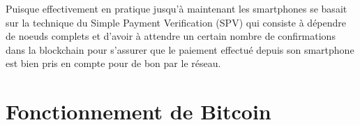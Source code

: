 \documentclass[12pt,a4paper]{article}
\begin{document}
	Puisque effectivement en pratique jusqu'à maintenant les smartphones se basait sur la technique du Simple Payment Verification (SPV) qui consiste à dépendre de noeuds complets et d'avoir à attendre un certain nombre de confirmations dans la blockchain pour s'assurer que le paiement effectué depuis son smartphone est bien pris en compte pour de bon par le réseau.\\
	
	
	
	\newpage
	
	\section{Fonctionnement de Bitcoin} %
	
\end{document}
